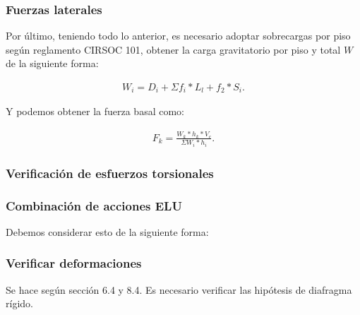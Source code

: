 \documentclass[../main.tex]{subfiles}
\begin{document}
\subsubsection{Fuerzas laterales}

Por último, teniendo todo lo anterior, es necesario adoptar sobrecargas por piso
según reglamento CIRSOC 101, obtener la carga gravitatorio por piso y total $W$ 
de la siguiente forma:

 \begin{align*}
  W_i = D_i + \Sigma f_i * L_l + f_2 * S_i 
.\end{align*}

Y podemos obtener la fuerza basal como:

\begin{align*}
  F_k = \frac{W_k*h_k*V_c}{\Sigma W_i*h_i}
.\end{align*}

\subsubsection{Verificación de esfuerzos torsionales}


\subsubsection{Combinación de acciones ELU}

Debemos considerar esto de la siguiente forma:


\subsubsection{Verificar deformaciones}

Se hace según sección 6.4 y 8.4.
Es necesario verificar las hipótesis de diafragma rígido.
\end{document}
